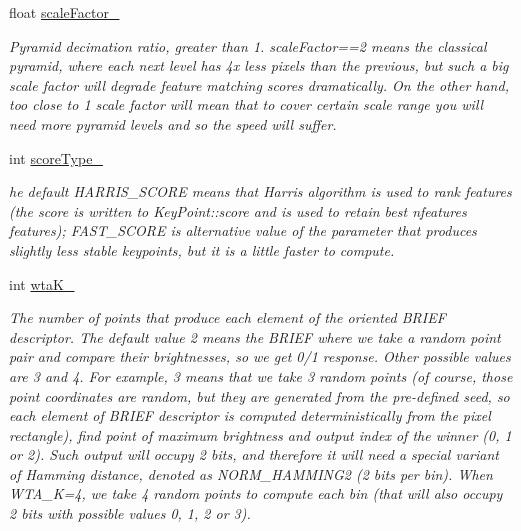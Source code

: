 \begin{DoxyCompactItemize}
float \hyperlink{group___feature_extractor_a8cbd44d79e8952dd7b51be32d1eaddee}{scale\-Factor\-\_\-}
\begin{DoxyCompactList}\small\item\em Pyramid decimation ratio, greater than 1. scale\-Factor==2 means the classical pyramid, where each next level has 4x less pixels than the previous, but such a big scale factor will degrade feature matching scores dramatically. On the other hand, too close to 1 scale factor will mean that to cover certain scale range you will need more pyramid levels and so the speed will suffer. \end{DoxyCompactList}\item 
int \hyperlink{group___feature_extractor_a9a4454ef09254b94d88d0b599ad84218}{score\-Type\-\_\-}
\begin{DoxyCompactList}\small\item\em he default H\-A\-R\-R\-I\-S\-\_\-\-S\-C\-O\-R\-E means that Harris algorithm is used to rank features (the score is written to Key\-Point\-::score and is used to retain best nfeatures features); F\-A\-S\-T\-\_\-\-S\-C\-O\-R\-E is alternative value of the parameter that produces slightly less stable keypoints, but it is a little faster to compute. \end{DoxyCompactList}\item 
int \hyperlink{group___feature_extractor_a05cc269e6833e1f25c7f7c31928a5ef6}{wta\-K\-\_\-}
\begin{DoxyCompactList}\small\item\em The number of points that produce each element of the oriented B\-R\-I\-E\-F descriptor. The default value 2 means the B\-R\-I\-E\-F where we take a random point pair and compare their brightnesses, so we get 0/1 response. Other possible values are 3 and 4. For example, 3 means that we take 3 random points (of course, those point coordinates are random, but they are generated from the pre-\/defined seed, so each element of B\-R\-I\-E\-F descriptor is computed deterministically from the pixel rectangle), find point of maximum brightness and output index of the winner (0, 1 or 2). Such output will occupy 2 bits, and therefore it will need a special variant of Hamming distance, denoted as N\-O\-R\-M\-\_\-\-H\-A\-M\-M\-I\-N\-G2 (2 bits per bin). When W\-T\-A\-\_\-\-K=4, we take 4 random points to compute each bin (that will also occupy 2 bits with possible values 0, 1, 2 or 3). \end{DoxyCompactList}\end{DoxyCompactItemize}


